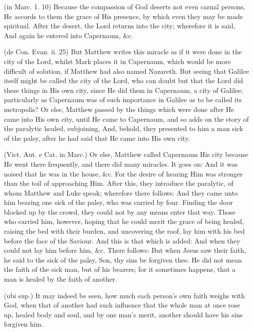 (in Marc. 1. 10) Because the compassion of God deserts not even carnal persons, He accords to them the grace of His presence, by which even they may be made spiritual. After the desert, the Lord returns into the city; wherefore it is said, And again he entered into Capernaum, \&c.

 (de Con. Evan. ii. 25) But Matthew writes this miracle as if it were done in the city of the Lord, whilst Mark places it in Capernaum, which would be more difficult of solution, if Matthew had also named Nazareth. But seeing that Galilee itself might be called the city of the Lord, who can doubt but that the Lord did these things in His own city, since He did them in Capernaum, a city of Galilee; particularly as Capernaum was of such importance in Galilee as to be called its metropolis? Or else, Matthew passed by the things which were done after He came into His own city, until He came to Capernaum, and so adds on the story of the paralytic healed, subjoining, And, behold, they presented to him a man sick of the palsy, after he had said that He came into His own city.

 (Vict. Aut. e Cat. in Marc.) Or else, Matthew called Capernaum His city because He went there frequently, and there did many miracles. It goes on: And it was noised that he was in the house, \&c. For the desire of hearing Him was stronger than the toil of approaching Him. After this, they introduce the paralytic, of whom Matthew and Luke speak; wherefore there follows: And they came unto him bearing one sick of the palsy, who was carried by four. Finding the door blocked up by the crowd, they could not by any means enter that way. Those who carried him, however, hoping that he could merit the grace of being healed, raising the bed with their burden, and uncovering the roof, lay him with his bed before the face of the Saviour. And this is that which is added: And when they could not lay him before him, \&c. There follows: But when Jesus saw their faith, he said to the sick of the palsy, Son, thy sins be forgiven thee. He did not mean the faith of the sick man, but of his bearers; for it sometimes happens, that a man is healed by the faith of another.

 (ubi sup.) It may indeed be seen, how much each person’s own faith weighs with God, when that of another had such influence that the whole man at once rose up, healed body and soul, and by one man’s merit, another should have his sins forgiven him.

